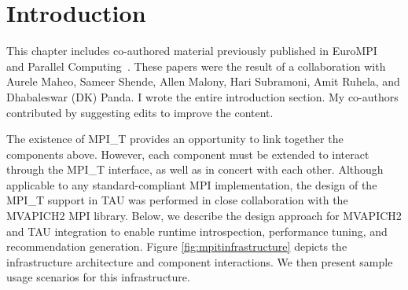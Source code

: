 \chapter{Introduction}
This chapter includes co-authored material previously published in EuroMPI~\cite{EuroMPI} and Parallel Computing~\cite{ParCo}. These papers were the result of a collaboration with Aurele Maheo, Sameer Shende, Allen Malony, Hari Subramoni, Amit Ruhela, and Dhabaleswar (DK) Panda. I wrote the entire introduction section. My co-authors contributed by suggesting edits to improve the content. 
\par The existence of MPI\_T provides an opportunity to link together the components above. However, each component must be extended to interact through the MPI\_T interface, as well as in concert with each other. Although applicable to any standard-compliant MPI implementation, the design of the MPI\_T support in TAU was performed in close collaboration with the MVAPICH2 MPI library. Below, we describe the design approach for MVAPICH2 and TAU integration to enable runtime introspection, performance tuning, and recommendation generation. Figure \ref{fig:mpitinfrastructure} depicts the infrastructure architecture and component interactions. We then present sample usage scenarios for this infrastructure. 

